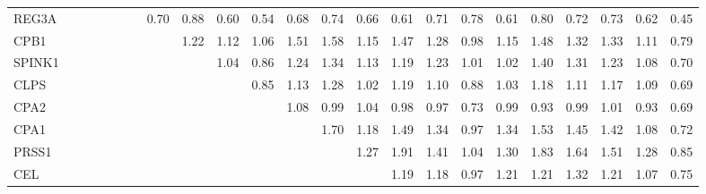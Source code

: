 \begin{longtable}{lrrrrrrrrrrrrrrrrrrrrrr}
REG3A    &              &              &              &             &             &             &       0.70 &         0.88 &       0.60 &       0.54 &       0.68 &        0.74 &      0.66 &        0.61 &           0.71 &      0.78 &          0.61 &      0.80 &        0.72 &        0.73 &       0.62 &       0.45 \\
CPB1     &              &              &              &             &             &             &            &         1.22 &       1.12 &       1.06 &       1.51 &        1.58 &      1.15 &        1.47 &           1.28 &      0.98 &          1.15 &      1.48 &        1.32 &        1.33 &       1.11 &       0.79 \\
SPINK1   &              &              &              &             &             &             &            &              &       1.04 &       0.86 &       1.24 &        1.34 &      1.13 &        1.19 &           1.23 &      1.01 &          1.02 &      1.40 &        1.31 &        1.23 &       1.08 &       0.70 \\
CLPS     &              &              &              &             &             &             &            &              &            &       0.85 &       1.13 &        1.28 &      1.02 &        1.19 &           1.10 &      0.88 &          1.03 &      1.18 &        1.11 &        1.17 &       1.09 &       0.69 \\
CPA2     &              &              &              &             &             &             &            &              &            &            &       1.08 &        0.99 &      1.04 &        0.98 &           0.97 &      0.73 &          0.99 &      0.93 &        0.99 &        1.01 &       0.93 &       0.69 \\
CPA1     &              &              &              &             &             &             &            &              &            &            &            &        1.70 &      1.18 &        1.49 &           1.34 &      0.97 &          1.34 &      1.53 &        1.45 &        1.42 &       1.08 &       0.72 \\
PRSS1    &              &              &              &             &             &             &            &              &            &            &            &             &      1.27 &        1.91 &           1.41 &      1.04 &          1.30 &      1.83 &        1.64 &        1.51 &       1.28 &       0.85 \\
CEL      &              &              &              &             &             &             &            &              &            &            &            &             &           &        1.19 &           1.18 &      0.97 &          1.21 &      1.21 &        1.32 &        1.21 &       1.07 &       0.75 \\

\end{longtable}
